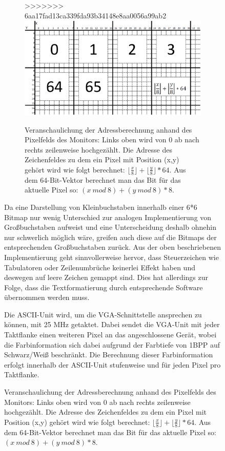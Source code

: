\begin{figure}[H]
\begin{figure}[H]
	\centering
>>>>>>> 6aa17fad13ca339fda93b34148e8aa0056a99ab2
	\label{fig:pixels}
		\includegraphics[width=1.0\textwidth]{Bildschirm.png}
	\caption[Veranschaulichung der Adressberechnung der ASCII-Unit]{Veranschaulichung der Adressberechnung anhand des Pixelfelds des Monitors: Links oben wird von 0 ab nach rechts zeilenweise hochgez\"ahlt. Die Adresse des Zeichenfeldes zu dem ein Pixel mit Position (x,y) geh\"ort wird wie folgt berechnet: $\lfloor \frac{x}{8} \rfloor + \lfloor \frac{y}{8} \rfloor * 64$. Aus dem 64-Bit-Vektor berechnet man das Bit f\"ur das aktuelle Pixel so: $(x\:  mod\:  8) + (y\:  mod\:  8) * 8$.}
\end{figure}

Da eine Darstellung von Kleinbuchstaben innerhalb einer 6*6 Bitmap nur wenig Unterschied zur analogen Implementierung von Gro\ss{}buchstaben aufweist und eine Unterscheidung deshalb ohnehin nur schwerlich m\"oglich w\"are, greifen auch diese auf die Bitmaps der entsprechenden Gro\ss{}buchstaben zur\"uck. Aus der oben beschriebenen Implementierung geht sinnvollerweise hervor, dass Steuerzeichen wie Tabulatoren oder Zeilenumbr\"uche keinerlei Effekt haben und deswegen auf leere Zeichen gemappt sind. Dies hat allerdings zur Folge, dass die Textformatierung durch entsprechende Software \"ubernommen werden muss.

Die ASCII-Unit wird, um die VGA-Schnittstelle ansprechen zu k\"onnen, mit 25 MHz getaktet. Dabei sendet die VGA-Unit mit jeder Taktflanke einen weiteren Pixel an das angeschlossene Ger\"at, wobei die Farbinformation sich dabei aufgrund der Farbtiefe von 1BPP auf Schwarz/Wei\ss{} beschr\"ankt. Die Berechnung dieser Farbinformation erfolgt innerhalb der ASCII-Unit stufenweise und f\"ur jeden Pixel pro Taktflanke. 


\end{figure}
